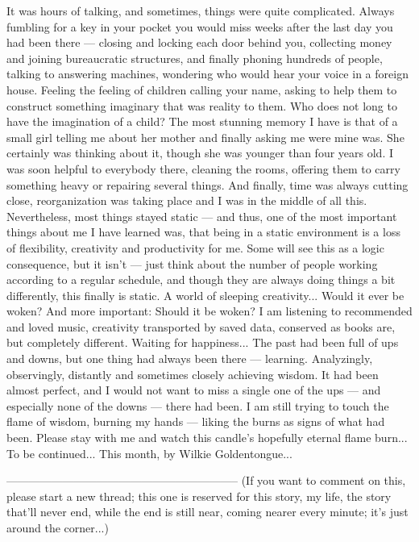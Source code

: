 It was hours of talking, and sometimes, things were quite complicated. Always fumbling for a key in your pocket you would miss weeks after the last day you had been there --- closing and locking each door behind you, collecting money and joining bureaucratic structures, and finally phoning hundreds of people, talking to answering machines, wondering who would hear your voice in a foreign house. 
Feeling the feeling of children calling your name, asking to help them to construct something imaginary that was reality to them. Who does not long to have the imagination of a child? 
The most stunning memory I have is that of a small girl telling me about her mother and finally asking me were mine was. She certainly was thinking about it, though she was younger than four years old. 
I was soon helpful to everybody there, cleaning the rooms, offering them to carry something heavy or repairing several things. And finally, time was always cutting close, reorganization was taking place and I was in the middle of all this. Nevertheless, most things stayed static --- and thus, one of the most important things about me I have learned was, that being in a static environment is a loss of flexibility, creativity and productivity for me. Some will see this as a logic consequence, but it isn't --- just think about the number of people working according to a regular schedule, and though they are always doing things a bit differently, this finally is static. A world of sleeping creativity... 
Would it ever be woken? And more important: Should it be woken? 
I am listening to recommended and loved music, creativity transported by saved data, conserved as books are, but completely different. Waiting for happiness... 
The past had been full of ups and downs, but one thing had always been there --- learning. Analyzingly, observingly, distantly and sometimes closely achieving wisdom. It had been almost perfect, and I would not want to miss a single one of the ups --- and especially none of the downs --- there had been. I am still trying to touch the flame of wisdom, burning my hands --- liking the burns as signs of what had been. 
Please stay with me and watch this candle's hopefully eternal flame burn... 
To be continued...
This month, by Wilkie Goldentongue...

--------------------------------------------------------------
(If you want to comment on this, please start a new thread; this one is reserved for this story, my life, the story that'll never end, while the end is still near, coming nearer every minute; it's just around the corner...)

